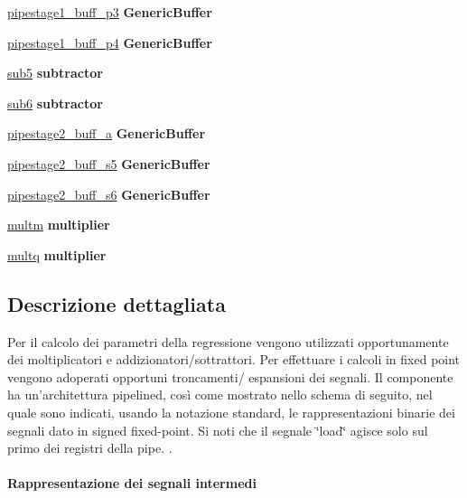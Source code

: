 \begin{DoxyCompactItemize}
\item 
\hyperlink{class_linear_regression_1_1_structural_a561aaea076fe5b5174fc967b43b9a50b}{pipestage1\+\_\+buff\+\_\+p3}  {\bfseries Generic\+Buffer}   
\item 
\hyperlink{class_linear_regression_1_1_structural_a00c4727e954b8596179b1413d78368e3}{pipestage1\+\_\+buff\+\_\+p4}  {\bfseries Generic\+Buffer}   
\item 
\hyperlink{class_linear_regression_1_1_structural_a3fd26266a39105aca90e2b7b13923619}{sub5}  {\bfseries subtractor}   
\item 
\hyperlink{class_linear_regression_1_1_structural_aa1ef9174550e2c151dd776bd1b40a330}{sub6}  {\bfseries subtractor}   
\item 
\hyperlink{class_linear_regression_1_1_structural_a2b5633f36737627deb24a9d93d9bf872}{pipestage2\+\_\+buff\+\_\+a}  {\bfseries Generic\+Buffer}   
\item 
\hyperlink{class_linear_regression_1_1_structural_a6923b4db7acadf52a9972d4eebfa370f}{pipestage2\+\_\+buff\+\_\+s5}  {\bfseries Generic\+Buffer}   
\item 
\hyperlink{class_linear_regression_1_1_structural_af53a49707b23b6676f25d84a39920009}{pipestage2\+\_\+buff\+\_\+s6}  {\bfseries Generic\+Buffer}   
\item 
\hyperlink{class_linear_regression_1_1_structural_ae1287e267811d8909891ccf15264a835}{multm}  {\bfseries multiplier}   
\item 
\hyperlink{class_linear_regression_1_1_structural_aea9e41f3216a842c46f31aa5a569fc8f}{multq}  {\bfseries multiplier}   
\end{DoxyCompactItemize}


\subsection{Descrizione dettagliata}
Per il calcolo dei parametri della regressione vengono utilizzati opportunamente dei moltiplicatori e addizionatori/sottrattori. Per effettuare i calcoli in fixed point vengono adoperati opportuni troncamenti/ espansioni dei segnali. Il componente ha un'architettura pipelined, così come mostrato nello schema di seguito, nel quale sono indicati, usando la notazione standard, le rappresentazioni binarie dei segnali dato in signed fixed-\/point. Si noti che il segnale \char`\"{}load\char`\"{} agisce solo sul primo dei registri della pipe. . 

\paragraph*{Rappresentazione dei segnali intermedi}

